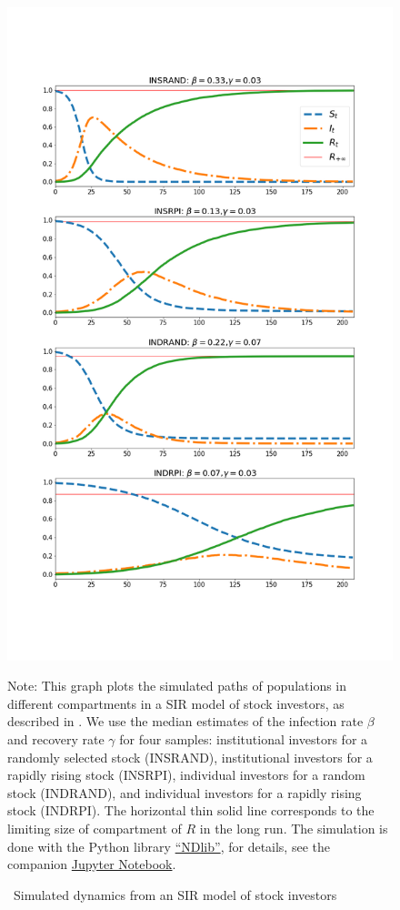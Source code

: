 	\begin{figure} \centering  %
		\caption{ ~Simulated dynamics from an SIR model of stock investors}
		\label{fig:sir_simulate}
		\centerline{\includegraphics[width=\textwidth,height=\textheight]{./figures/sir_simulate.png}}
		\begin{flushleft}
			{\footnotesize Note: This graph plots the simulated paths of populations in different compartments in a SIR model of stock investors, as described in \cite{shiller1989survey}. We use the median estimates of the infection rate $\beta$ and recovery rate $\gamma$ for four samples: institutional investors for a randomly selected stock (INSRAND), institutional investors for a rapidly rising stock (INSRPI), individual investors for a random stock (INDRAND), and individual investors for a rapidly rising stock (INDRPI). The horizontal thin solid line corresponds to the limiting size of compartment of $R$ in the long run. The simulation is done with the Python library \href{https://ndlib.readthedocs.io/en/latest/}{``NDlib''}, for details, see the companion \href{https://github.com/llorracc/EpiExp/blob/master/SIR_Ndlib.ipynb}{Jupyter Notebook}. }
		\end{flushleft}
	\end{figure}
